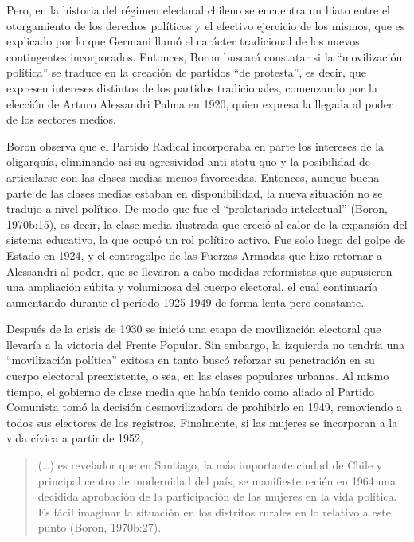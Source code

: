 Pero, en la historia del régimen electoral chileno se encuentra un hiato entre el otorgamiento de los derechos políticos y el efectivo ejercicio de los mismos, que es explicado por lo que Germani llamó el carácter tradicional de los nuevos contingentes incorporados. Entonces, Boron buscará constatar si la \enquote{movilización política} se traduce en la creación de partidos \enquote{de protesta}, es decir, que expresen intereses distintos de los partidos tradicionales, comenzando por la elección de Arturo Alessandri Palma en 1920, quien expresa la llegada al poder de los sectores medios.

Boron observa que el Partido Radical incorporaba en parte los intereses de la oligarquía, eliminando así su agresividad anti statu quo y la posibilidad de articularse con las clases medias menos favorecidas. Entonces, aunque buena parte de las clases medias estaban en disponibilidad, la nueva situación no se tradujo a nivel político. De modo que fue el \enquote{proletariado intelectual} (Boron, 1970b:15), es decir, la clase media ilustrada que creció al calor de la expansión del sistema educativo, la que ocupó un rol político activo. Fue solo luego del golpe de Estado en 1924, y el contragolpe de las Fuerzas Armadas que hizo retornar a Alessandri al poder, que se llevaron a cabo medidas reformistas que supusieron una ampliación súbita y voluminosa del cuerpo electoral, el cual continuaría aumentando durante el período 1925-1949 de forma lenta pero constante.

Después de la crisis de 1930 se inició una etapa de movilización electoral que llevaría a la victoria del Frente Popular. Sin embargo, la izquierda no tendría una \enquote{movilización política} exitosa en tanto buscó reforzar su penetración en su cuerpo electoral preexistente, o sea, en las clases populares urbanas. Al mismo tiempo, el gobierno de clase media que había tenido como aliado al Partido Comunista tomó la decisión desmovilizadora de prohibirlo en 1949, removiendo a todos sus electores de los registros. Finalmente, si las mujeres se incorporan a la vida cívica a partir de 1952,

\begin{quote}
(\dots) es revelador que en Santiago, la más importante ciudad de Chile y principal centro de modernidad del país, se manifieste recién en 1964 una decidida aprobación de la participación de las mujeres en la vida política. Es fácil imaginar la situación en los distritos rurales en lo relativo a este punto (Boron, 1970b:27).
\end{quote}

